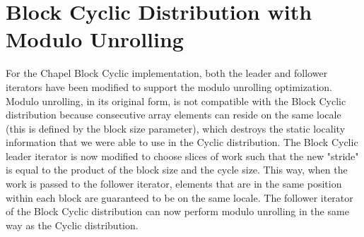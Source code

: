 \section{Block Cyclic Distribution with Modulo Unrolling}\label{sec:block_cyclic_modulo}

For the Chapel Block Cyclic implementation, both the leader and follower iterators have been modified to support the modulo unrolling optimization. Modulo unrolling, in its original form, is not compatible with the Block Cyclic distribution because consecutive array elements can reside on the same locale (this is defined by the block size parameter), which destroys the static locality information that we were able to use in the Cyclic distribution. The Block Cyclic leader iterator is now modified to choose slices of work such that the new "stride" is equal to the product of the block size and the cycle size. This way, when the work is passed to the follower iterator, elements that are in the same position within each block are guaranteed to be on the same locale. The follower iterator of the Block Cyclic distribution can now perform modulo unrolling in the same way as the Cyclic distribution. 

